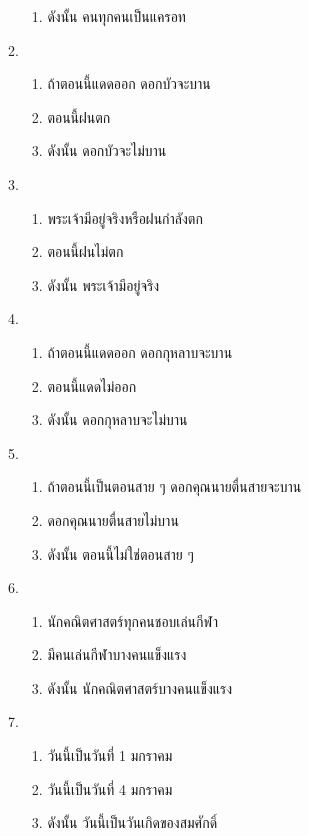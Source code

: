 \documentclass[a4paper,12pt]{extbook}
\theoremstyle{definition}
\theoremstyle{remark}
\begin{document}
\begin{enumerate}
\begin{enumerate}[label={(\arabic*)}]
\begin{enumerate}[label={\arabic*.}]
						\item[] ดังนั้น คนทุกคนเป็นแครอท
					\end{enumerate}
					\item 
					\begin{enumerate}[label={\arabic*.}]
						\item ถ้าตอนนี้แดดออก ดอกบัวจะบาน
						\item ตอนนี้ฝนตก
						\item[] ดังนั้น ดอกบัวจะไม่บาน
					\end{enumerate}
					\item 
					\begin{enumerate}[label={\arabic*.}]
						\item พระเจ้ามีอยู่จริงหรือฝนกำลังตก
						\item ตอนนี้ฝนไม่ตก
						\item[] ดังนั้น พระเจ้ามีอยู่จริง
					\end{enumerate}
					\item 
					\begin{enumerate}[label={\arabic*.}]
						\item ถ้าตอนนี้แดดออก ดอกกุหลาบจะบาน
						\item ตอนนี้แดดไม่ออก
						\item[] ดังนั้น ดอกกุหลาบจะไม่บาน
					\end{enumerate}
					\item 
					\begin{enumerate}[label={\arabic*.}]
						\item ถ้าตอนนี้เป็นตอนสาย ๆ ดอกคุณนายตื่นสายจะบาน
						\item ดอกคุณนายตื่นสายไม่บาน
						\item[] ดังนั้น ตอนนี้ไม่ใช่ตอนสาย ๆ
					\end{enumerate}
					\item 
					\begin{enumerate}[label={\arabic*.}]
						\item นักคณิตศาสตร์ทุกคนชอบเล่นกีฬา
						\item มีคนเล่นกีฬาบางคนแข็งแรง
						\item[] ดังนั้น นักคณิตศาสตร์บางคนแข็งแรง
					\end{enumerate}
					\item 
					\begin{enumerate}[label={\arabic*.}]
						\item วันนี้เป็นวันที่ 1 มกราคม
						\item วันนี้เป็นวันที่ 4 มกราคม
						\item[] ดังนั้น วันนี้เป็นวันเกิดของสมศักดิ์

\end{enumerate}
\end{enumerate}
\end{enumerate}
\end{document}
